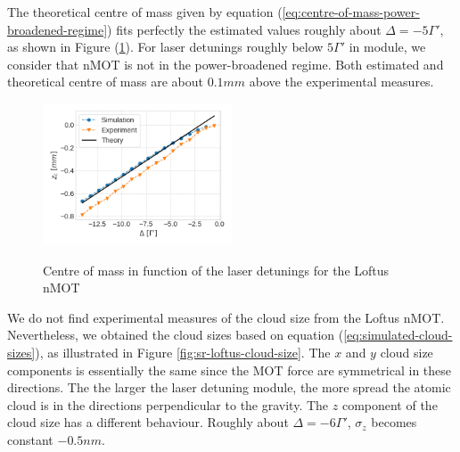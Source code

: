 The theoretical centre of mass given by equation (\ref{eq:centre-of-mass-power-broadened-regime}) fits perfectly the estimated values roughly about $ \Delta = -5\Gamma' $, as shown in Figure (\ref{fig:sr-centre-of-mass}). For laser detunings roughly below $ 5\Gamma' $ in module, we consider that nMOT is not in the power-broadened regime. Both estimated and theoretical centre of mass are about $ 0.1 mm $ above the experimental measures.

\begin{figure}[!ht]
    \centering
    \caption{Centre of mass in function of the laser detunings for the Loftus nMOT}
    \includegraphics[width=0.5\textwidth]{USPSC-img/sr_centre_of_mass.png}
    \vspace{5px}
    \label{fig:sr-centre-of-mass}
\end{figure}

We do not find experimental measures of the cloud size from the Loftus nMOT. Nevertheless, we obtained the cloud sizes based on equation (\ref{eq:simulated-cloud-sizes}), as illustrated in Figure \ref{fig:sr-loftus-cloud-size}. The $x$ and $y$ cloud size components is essentially the same since the MOT force are symmetrical in these directions. The the larger the laser detuning module, the more spread the atomic cloud is in the directions perpendicular to the gravity. The $z$ component of the cloud size has a different behaviour. Roughly about $ \Delta = -6\Gamma' $, $ \sigma_z $ becomes constant $ -0.5nm $.

